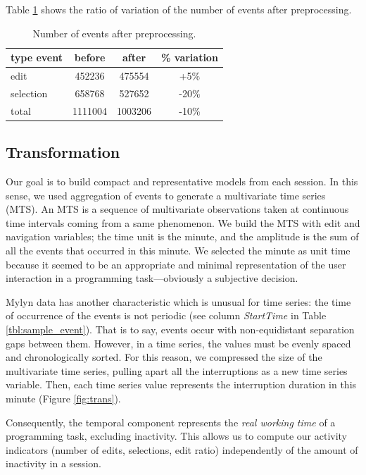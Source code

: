 \documentclass[times]{smrauth}
\begin{document}
 Table \ref{tbl:mass_events} shows the ratio of variation of the number of events after preprocessing.
 
 \begin{table}[hb!]
 \tiny
 \renewcommand{\arraystretch}{1.3}
 \caption{Number of events after preprocessing.}
 \label{tbl:mass_events}
 \centering
 \begin{tabular}{l | c | c | c } 
   type event & before & after & \% variation  \\  
   \hline 
   edit &	 452236 & 475554 &	+5\%   \\
   selection &	658768 & 527652 & -20\%   \\
   \hline
   total & 1111004 & 1003206 & -10\%  \\
 \end{tabular}
 \end{table}

\subsection{Transformation}
Our goal is to build compact and representative models from each session. In this sense, we used aggregation of events to generate a multivariate time series (MTS). An MTS is a sequence of multivariate observations taken at continuous time intervals coming from a same phenomenon. We build the MTS with edit and navigation variables; the time unit is the minute, and the amplitude is the sum of all the events that occurred in this minute. We selected the minute as unit time because it seemed to be an appropriate and minimal representation of the user interaction in a programming task---obviously a subjective decision. 


Mylyn data has another characteristic which is unusual for time series: the time of occurrence of the events is not periodic (see column \textit{StartTime} in Table \ref{tbl:sample_event}). That is to say, events occur with non-equidistant separation gaps between them. However, in a time series, the values must be evenly spaced and chronologically sorted. For this reason, we compressed the size of the multivariate time series, pulling apart all the interruptions as a new time series variable. Then, each time series value represents the interruption duration in this minute (Figure \ref{fig:trans}). 


Consequently, the temporal component represents the \textit{real working time} of a programming task, excluding inactivity. This allows us to compute our activity indicators (number of edits, selections, edit ratio) independently of the amount of inactivity in a session.
\end{document}
